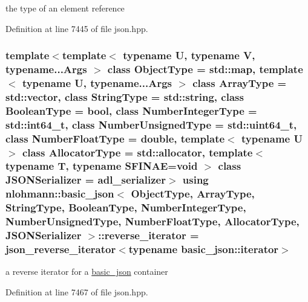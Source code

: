 the type of an element reference 



Definition at line 7445 of file json.\+hpp.

\subsubsection[{\texorpdfstring{reverse\+\_\+iterator}{reverse_iterator}}]{\setlength{\rightskip}{0pt plus 5cm}template$<$template$<$ typename U, typename V, typename...\+Args $>$ class Object\+Type = std\+::map, template$<$ typename U, typename...\+Args $>$ class Array\+Type = std\+::vector, class String\+Type  = std\+::string, class Boolean\+Type  = bool, class Number\+Integer\+Type  = std\+::int64\+\_\+t, class Number\+Unsigned\+Type  = std\+::uint64\+\_\+t, class Number\+Float\+Type  = double, template$<$ typename U $>$ class Allocator\+Type = std\+::allocator, template$<$ typename T, typename S\+F\+I\+N\+A\+E=void $>$ class J\+S\+O\+N\+Serializer = adl\+\_\+serializer$>$ using {\bf nlohmann\+::basic\+\_\+json}$<$ Object\+Type, Array\+Type, String\+Type, Boolean\+Type, Number\+Integer\+Type, Number\+Unsigned\+Type, Number\+Float\+Type, Allocator\+Type, J\+S\+O\+N\+Serializer $>$\+::{\bf reverse\+\_\+iterator} =  {\bf json\+\_\+reverse\+\_\+iterator}$<$typename {\bf basic\+\_\+json\+::iterator}$>$}\hypertarget{classnlohmann_1_1basic__json_ac223d5560c2b05a208c88de67376c5f2}{}\label{classnlohmann_1_1basic__json_ac223d5560c2b05a208c88de67376c5f2}


a reverse iterator for a \hyperlink{classnlohmann_1_1basic__json}{basic\+\_\+json} container 



Definition at line 7467 of file json.\+hpp.

